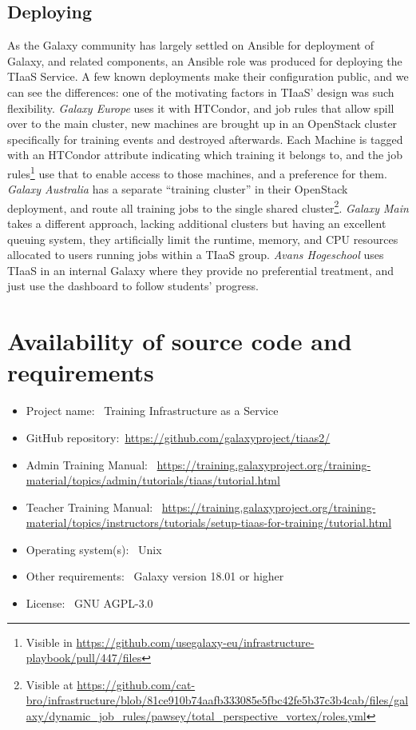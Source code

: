 \documentclass[a4paper,num-refs]{oup-contemporary}
\begin{document}
\subsection{Deploying}
As the Galaxy community has largely settled on Ansible for deployment of Galaxy, and related components, an Ansible role was produced for deploying the TIaaS Service. A few known deployments make their configuration public, and we can see the differences: one of the motivating factors in TIaaS' design was such flexibility. \emph{Galaxy Europe} uses it with HTCondor, and job rules that allow spill over to the main cluster, new machines are brought up in an OpenStack cluster specifically for training events and destroyed afterwards. Each Machine is tagged with an HTCondor attribute indicating which training it belongs to, and the job rules\footnote{Visible in \url{https://github.com/usegalaxy-eu/infrastructure-playbook/pull/447/files}} use that to enable access to those machines, and a preference for them. \emph{Galaxy Australia} has a separate ``training cluster'' in their OpenStack deployment, and route all training jobs to the single shared cluster\footnote{Visible at \url{https://github.com/cat-bro/infrastructure/blob/81ce910b74aafb333085e5fbc42fe5b37c3b4cab/files/galaxy/dynamic_job_rules/pawsey/total_perspective_vortex/roles.yml}}. \emph{Galaxy Main} takes a different approach, lacking additional clusters but having an excellent queuing system, they artificially limit the runtime, memory, and CPU resources allocated to users running jobs within a TIaaS group. \emph{Avans Hogeschool} uses TIaaS in an internal Galaxy where they provide no preferential treatment, and just use the dashboard to follow students' progress.

\section{Availability of source code and requirements}

\begin{itemize}
\item Project name: ~Training Infrastructure as a Service
\item GitHub repository:~\url{https://github.com/galaxyproject/tiaas2/}
\item Admin Training Manual: ~\url{https://training.galaxyproject.org/training-material/topics/admin/tutorials/tiaas/tutorial.html}
\item Teacher Training Manual: ~\url{https://training.galaxyproject.org/training-material/topics/instructors/tutorials/setup-tiaas-for-training/tutorial.html}
\item Operating system(s): ~Unix
\item Other requirements: ~Galaxy version 18.01 or higher
\item License: ~GNU AGPL-3.0
\end{itemize}
\end{document}
